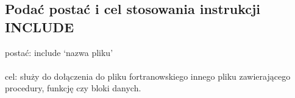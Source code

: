 \subsection{Podać postać i cel stosowania instrukcji INCLUDE}
postać: include `nazwa pliku'
\\
\\
cel: służy do dołączenia do pliku fortranowskiego innego pliku zawierającego procedury, funkcję czy bloki danych.